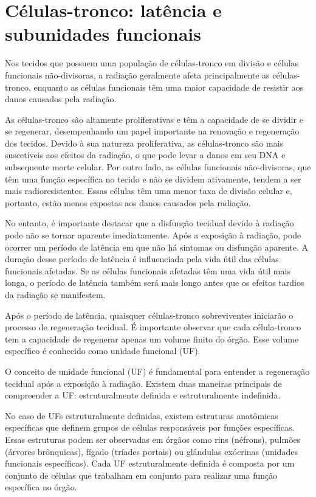 \documentclass[11pt,a4paper]{article}
\begin{document}
\section{Células-tronco: latência e subunidades funcionais}

	Nos tecidos que possuem uma população de células-tronco em divisão e células funcionais não-divisoras, a radiação geralmente afeta principalmente as células-tronco, enquanto as células funcionais têm uma maior capacidade de resistir aos danos causados pela radiação.

	As células-tronco são altamente proliferativas e têm a capacidade de se dividir e se regenerar, desempenhando um papel importante na renovação e regeneração dos tecidos. Devido à sua natureza proliferativa, as células-tronco são mais suscetíveis aos efeitos da radiação, o que pode levar a danos em seu DNA e subsequente morte celular. Por outro lado, as células funcionais não-divisoras, que têm uma função específica no tecido e não se dividem ativamente, tendem a ser mais radioresistentes. Essas células têm uma menor taxa de divisão celular e, portanto, estão menos expostas aos danos causados pela radiação.

	No entanto, é importante destacar que a disfunção tecidual devido à radiação pode não se tornar aparente imediatamente. Após a exposição à radiação, pode ocorrer um período de latência em que não há sintomas ou disfunção aparente. A duração desse período de latência é influenciada pela vida útil das células funcionais afetadas. Se as células funcionais afetadas têm uma vida útil mais longa, o período de latência também será mais longo antes que os efeitos tardios da radiação se manifestem.

	Após o período de latência, quaisquer células-tronco sobreviventes iniciarão o processo de regeneração tecidual. É importante observar que cada célula-tronco tem a capacidade de regenerar apenas um volume finito do órgão. Esse volume específico é conhecido como unidade funcional (UF). 

	O conceito de unidade funcional (UF) é fundamental para entender a regeneração tecidual após a exposição à radiação. Existem duas maneiras principais de compreender a UF: estruturalmente definida e estruturalmente indefinida.

	No caso de UFs estruturalmente definidas, existem estruturas anatômicas específicas que definem grupos de células responsáveis por funções específicas. Essas estruturas podem ser observadas em órgãos como rins (néfrons), pulmões (árvores brônquicas), fígado (tríades portais) ou glândulas exócrinas (unidades funcionais específicas). Cada UF estruturalmente definida é composta por um conjunto de células que trabalham em conjunto para realizar uma função específica no órgão.
\end{document}
